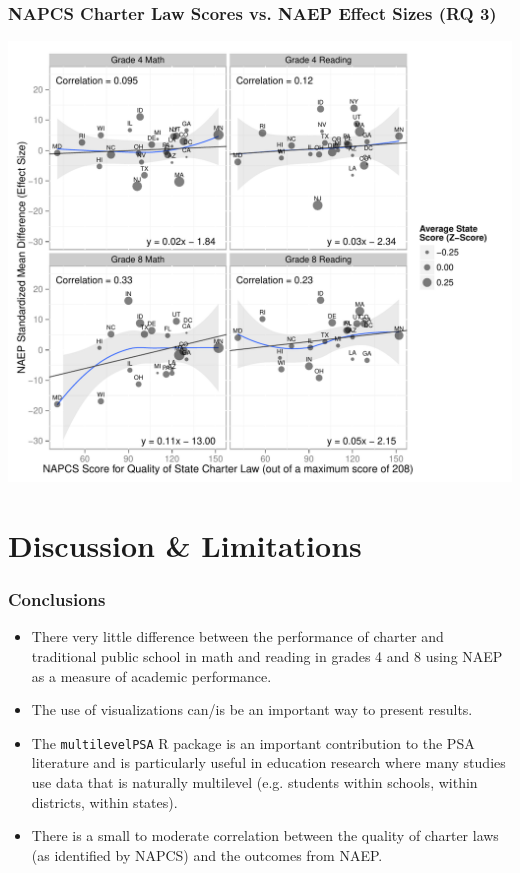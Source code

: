 \documentclass[10pt,handout,mathserif]{beamer}
\begin{document}
\begin{frame}[c]
	\frametitle{NAPCS Charter Law Scores vs. NAEP Effect Sizes (RQ 3)}
	\begin{center}
	\includegraphics[height=.85\textheight,keepaspectratio]{../Figures2009/LawScoresVsNAEPDifferences}
	\end{center}
\end{frame}


\section{Discussion \& Limitations}

\begin{frame}[c]
    \frametitle{Conclusions}
    \begin{itemize}
    \setlength{\itemsep}{10pt}
        \item There very little difference between the performance of charter and traditional public school in math and reading in grades 4 and 8 using NAEP as a measure of academic performance.
        \item The use of visualizations can/is be an important way to present results.
        \item The \texttt{multilevelPSA} R package is an important contribution to the PSA literature and is particularly useful in education research where many studies use data that is naturally multilevel (e.g. students within schools, within districts, within states).
        \item There is a small to moderate correlation between the quality of charter laws (as identified by NAPCS) and the outcomes from NAEP.
    \end{itemize}
\end{frame}
\end{document}
